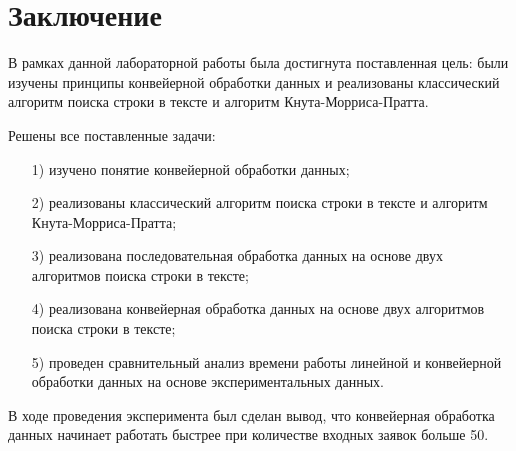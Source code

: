 {\center\chapter*{Заключение}}

В рамках данной лабораторной работы была достигнута поставленная цель: были изучены принципы конвейерной обработки данных и реализованы классический алгоритм поиска строки в тексте и алгоритм Кнута-Морриса-Пратта.

Решены все поставленные задачи:

\begin{enumerate}
\item[1)] изучено понятие конвейерной обработки данных;
\item[2)] реализованы классический алгоритм поиска строки в тексте и алгоритм Кнута-Морриса-Пратта;
\item[3)] реализована последовательная обработка данных на основе двух алгоритмов поиска строки в тексте;
\item[4)] реализована конвейерная обработка данных на основе двух алгоритмов поиска строки в тексте;
\item[5)] проведен сравнительный анализ времени работы линейной и конвейерной обработки данных на основе экспериментальных данных.
\end{enumerate}

В ходе проведения эксперимента был сделан вывод, что конвейерная обработка данных начинает работать быстрее при количестве входных заявок больше 50.
